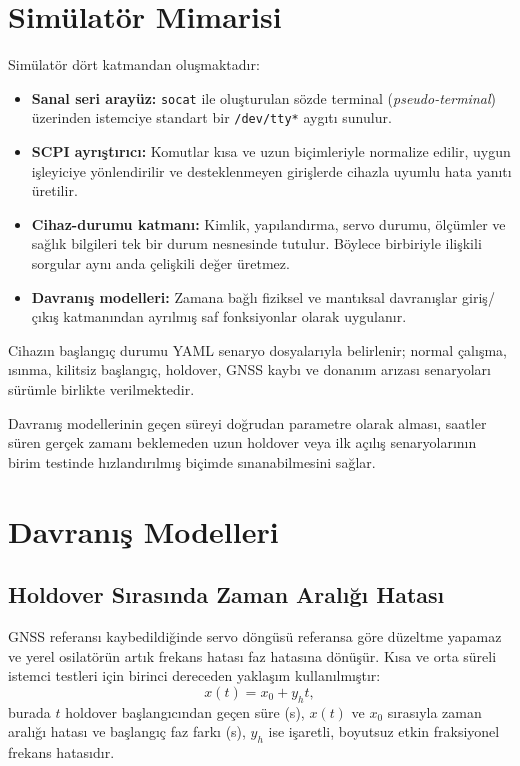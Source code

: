 \documentclass[9pt,twocolumn,a4paper]{extarticle}
\begin{document}
\section{Simülatör Mimarisi}
Simülatör dört katmandan oluşmaktadır:
\begin{itemize}
    \item \textbf{Sanal seri arayüz:} \texttt{socat} ile oluşturulan sözde terminal (\emph{pseudo-terminal}) üzerinden istemciye standart bir \texttt{/dev/tty*} aygıtı sunulur.
    \item \textbf{SCPI ayrıştırıcı:} Komutlar kısa ve uzun biçimleriyle normalize edilir, uygun işleyiciye yönlendirilir ve desteklenmeyen girişlerde cihazla uyumlu hata yanıtı üretilir.
    \item \textbf{Cihaz-durumu katmanı:} Kimlik, yapılandırma, servo durumu, ölçümler ve sağlık bilgileri tek bir durum nesnesinde tutulur. Böylece birbiriyle ilişkili sorgular aynı anda çelişkili değer üretmez.
    \item \textbf{Davranış modelleri:} Zamana bağlı fiziksel ve mantıksal davranışlar giriş/çıkış katmanından ayrılmış saf fonksiyonlar olarak uygulanır.
\end{itemize}

Cihazın başlangıç durumu YAML senaryo dosyalarıyla belirlenir; normal çalışma, ısınma, kilitsiz başlangıç, holdover, GNSS kaybı ve donanım arızası senaryoları sürümle birlikte verilmektedir.

Davranış modellerinin geçen süreyi doğrudan parametre olarak alması, saatler süren gerçek zamanı beklemeden uzun holdover veya ilk açılış senaryolarının birim testinde hızlandırılmış biçimde sınanabilmesini sağlar.

\section{Davranış Modelleri}
\subsection{Holdover Sırasında Zaman Aralığı Hatası}
GNSS referansı kaybedildiğinde servo döngüsü referansa göre düzeltme yapamaz ve yerel osilatörün artık frekans hatası faz hatasına dönüşür. Kısa ve orta süreli istemci testleri için birinci dereceden yaklaşım kullanılmıştır:
\begin{equation}
    x(t)=x_0+y_h t,
    \label{eq:holdover}
\end{equation}
burada $t$ holdover başlangıcından geçen süre (s), $x(t)$ ve $x_0$ sırasıyla zaman aralığı hatası ve başlangıç faz farkı (s), $y_h$ ise işaretli, boyutsuz etkin fraksiyonel frekans hatasıdır.
\end{document}
